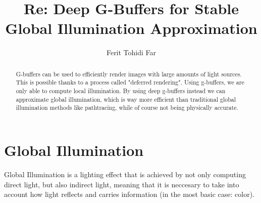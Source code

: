 \documentclass{ACGSeminar}
\begin{document}
\title{Re: Deep G-Buffers for Stable Global Illumination Approximation}

\author{Ferit Tohidi Far}

\maketitle


\begin{abstract}%
G-buffers can be used to efficiently render images with large amounts of light sources. This is possible thanks to a process called "deferred rendering". Using 
g-buffers, we are only able to compute local illumination. By using deep g-buffers instead we can approximate global illumination, which is way more 
efficient than traditional global illumination methods like pathtracing, while of course not being physically accurate. 
\end{abstract}

\tableofcontents

\label{cha:references}

\newpage

\label{cha:introduction}
\section{Global Illumination}
	Global Illumination is a lighting effect that is achieved by not only computing direct light, but also indirect light, meaning that it is neccesary to take
	into account how light reflects and carries information (in the most basic case: color).
\end{document}
